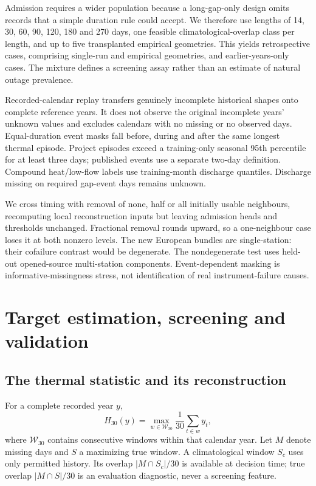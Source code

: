 Admission requires a wider population because a long-gap-only design omits records that a simple duration rule could accept. We therefore use lengths of 14, 30, 60, 90, 120, 180 and 270 days, one feasible climatological-overlap class per length, and up to five transplanted empirical geometries. This yields \RAdmissionCases{} retrospective cases, comprising \RStratifiedCases{} single-run and \REmpiricalCases{} empirical geometries, and \RPriorAdmissionCases{} earlier-years-only cases. The mixture defines a screening assay rather than an estimate of natural outage prevalence.

Recorded-calendar replay transfers genuinely incomplete historical shapes onto complete reference years. It does not observe the original incomplete years' unknown values and excludes calendars with no missing or no observed days. Equal-duration event masks fall before, during and after the same longest thermal episode. Project episodes exceed a training-only seasonal 95th percentile for at least three days; published events use a separate two-day definition. Compound heat/low-flow labels use training-month discharge quantiles. Discharge missing on required gap-event days remains unknown.

We cross timing with removal of none, half or all initially usable neighbours, recomputing local reconstruction inputs but leaving admission heads and thresholds unchanged. Fractional removal rounds upward, so a one-neighbour case loses it at both nonzero levels. The new European bundles are single-station: their cofailure contrast would be degenerate. The nondegenerate test uses held-out opened-source multi-station components. Event-dependent masking is informative-missingness stress, not identification of real instrument-failure causes.

\section{Target estimation, screening and validation}

\subsection{The thermal statistic and its reconstruction}

For a complete recorded year $y$,
\begin{equation}
H_{30}(y)=\max_{w\in\mathcal W_{30}}\frac{1}{30}\sum_{t\in w}y_t,
\end{equation}
where $\mathcal W_{30}$ contains consecutive windows within that calendar year. Let $M$ denote missing days and $S$ a maximizing true window. A climatological window $S_c$ uses only permitted history. Its overlap $|M\cap S_c|/30$ is available at decision time; true overlap $|M\cap S|/30$ is an evaluation diagnostic, never a screening feature.

